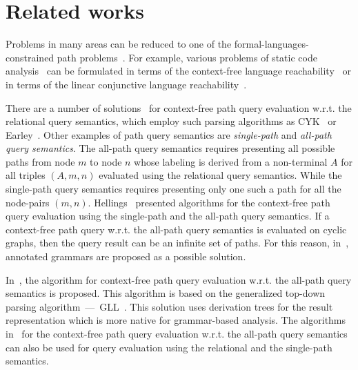 \section{Related works} \label{section_related}
Problems in many areas can be reduced to one of the formal-languages-constrained path problems~\cite{barrett2000formal}. For example, various problems of static code analysis~\cite{bastani2015specification,xu2009scaling} can be formulated in terms of the context-free language reachability~\cite{reps1998program} or in terms of the linear conjunctive language reachability~\cite{zhang2017context}. 


There are a number of solutions~\cite{hellingsRelational, GraphQueryWithEarley, RDF, azimov2018context} for context-free path query evaluation w.r.t. the relational query semantics, which employ such parsing algorithms as CYK~\cite{kasami, younger} or Earley~\cite{Grune}. Other examples of path query semantics are \textit{single-path} and \textit{all-path query semantics}. The all-path query semantics requires presenting all possible paths from node $m$ to node $n$ whose labeling is derived from a non-terminal $A$ for all triples $(A, m, n)$ evaluated using the relational query semantics. While the single-path query semantics requires presenting only one such a path for all the node-pairs $(m, n)$. Hellings~\cite{hellingsPathQuerying} presented algorithms for the context-free path query evaluation using the single-path and the all-path query semantics. If a context-free path query w.r.t. the all-path query semantics is evaluated on cyclic graphs, then the query result can be an infinite set of paths. For this reason, in~\cite{hellingsPathQuerying}, annotated grammars are proposed as a possible solution.

In~\cite{GLL}, the algorithm for context-free path query evaluation w.r.t. the all-path query semantics is proposed. This algorithm is based on the generalized top-down parsing algorithm~---~GLL~\cite{scott2010gll}. This solution uses derivation trees for the result representation which is more native for grammar-based analysis. The algorithms in~\cite{GLL, hellingsPathQuerying} for the context-free path query evaluation w.r.t. the all-path query semantics can also be used for query evaluation using the relational and the single-path semantics.

